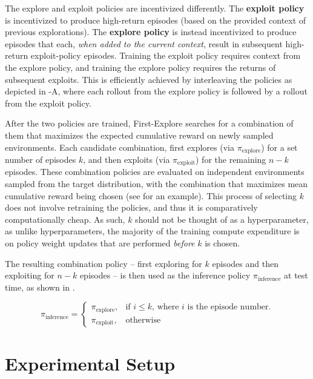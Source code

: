 \documentclass{article}
\begin{document}
The explore and exploit policies are incentivized differently. The \textbf{exploit policy} is incentivized to produce high-return episodes (based on the provided context of previous explorations). The \textbf{explore policy} is instead incentivized to produce episodes that each, \emph{when added to the current context}, result in subsequent high-return exploit-policy episodes. Training the exploit policy requires context from the explore policy, and training the explore policy requires the returns of subsequent exploits. This is efficiently achieved by interleaving the policies as depicted in -A, where each rollout from the explore policy is followed by a rollout from the exploit policy.

After the two policies are trained, First-Explore searches for a combination of them that maximizes the expected cumulative reward on newly sampled environments.
%
Each candidate combination, first explores (via \(\pi_{\text{explore}}\)) for a set number of episodes \(k\), and then exploits (via \(\pi_{\text{exploit}}\)) for the remaining \(n-k\) episodes. These combination policies are evaluated on independent environments sampled from the target distribution, with the combination that maximizes mean cumulative reward being chosen (see  for an example). 
This process of selecting \(k\) does not involve retraining the policies, and thus it is comparatively computationally cheap. As such, \(k\) should not be thought of as a hyperparameter, as unlike hyperparameters, the majority of the training compute expenditure is on policy weight updates that are performed \textit{before} \(k\) is chosen.

The resulting combination policy -- first exploring for \(k\) episodes and then exploiting for \(n-k\) episodes -- is then used as the inference policy \(\pi_{\text{inference}}\) at test time, as shown in .

\begin{equation}
\label{inference_eqn}
\pi_{\text{inference}} =
\begin{cases}
    \pi_{\text{explore}},& \text{if } i \leq k \text{, where \(i\) is the episode number.}\\
    \pi_{\text{exploit}},              & \text{otherwise}
\end{cases} 
\end{equation}

\section{Experimental Setup}
\end{document}
